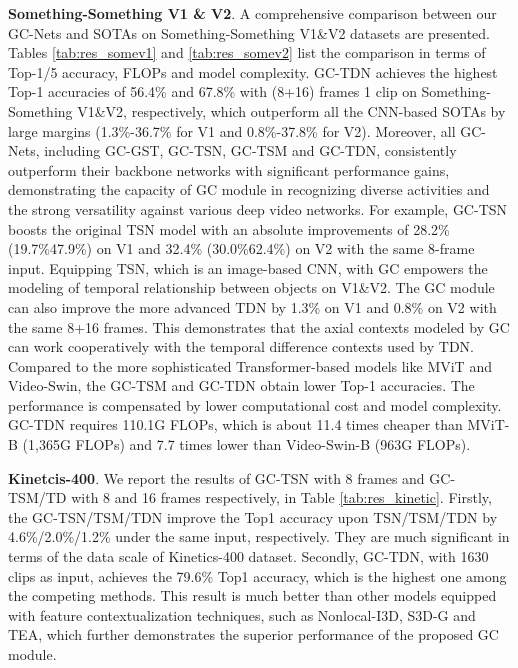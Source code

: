 {\bf Something-Something V1 \& V2}. A comprehensive comparison between our GC-Nets and SOTAs on Something-Something V1\&V2  datasets are presented. Tables \ref{tab:res_somev1} and \ref{tab:res_somev2} list the comparison in terms of Top-1/5 accuracy, FLOPs and model complexity. GC-TDN achieves the highest Top-1 accuracies of 56.4\% and 67.8\% with (8+16) frames  1 clip on Something-Something V1\&V2, respectively, which outperform all the CNN-based SOTAs by large margins (1.3\%-36.7\% for V1 and 0.8\%-37.8\% for V2). Moreover, all GC-Nets, including GC-GST, GC-TSN, GC-TSM and GC-TDN, consistently outperform their backbone networks with significant performance gains, demonstrating the capacity of GC module in recognizing diverse activities and the strong versatility against various deep video networks. For example, GC-TSN boosts the original TSN model with an absolute improvements of 28.2\% (19.7\%47.9\%) on V1 and 32.4\% (30.0\%62.4\%) on V2 with the same 8-frame input. Equipping TSN, which is an image-based CNN, with GC empowers the modeling of temporal relationship between objects on V1\&V2. The GC module can also improve the more advanced TDN by 1.3\% on V1 and 0.8\% on V2 with the same 8+16 frames. This demonstrates that the axial contexts modeled by GC can work cooperatively with the temporal difference contexts used by TDN. Compared to the more sophisticated Transformer-based models like MViT and Video-Swin, the GC-TSM and GC-TDN obtain lower Top-1 accuracies. The performance is compensated by lower computational cost and model complexity. GC-TDN requires 110.1G FLOPs, which is about 11.4 times cheaper than MViT-B (1,365G FLOPs) and 7.7 times lower than Video-Swin-B (963G FLOPs).


{\bf Kinetcis-400}. We report the results of GC-TSN with 8 frames and GC-TSM/TD with 8 and 16 frames respectively, in Table \ref{tab:res_kinetic}. Firstly, the GC-TSN/TSM/TDN improve the Top1 accuracy upon TSN/TSM/TDN by 4.6\%/2.0\%/1.2\% under the same input, respectively. They are much significant in terms of the data scale of Kinetics-400 dataset. Secondly, GC-TDN, with 1630 clips as input, achieves the 79.6\% Top1 accuracy, which is the highest one among the competing methods. This result is much better than other models equipped with feature contextualization techniques, such as  Nonlocal-I3D, S3D-G and TEA, which further demonstrates the superior performance of the proposed GC module. 


